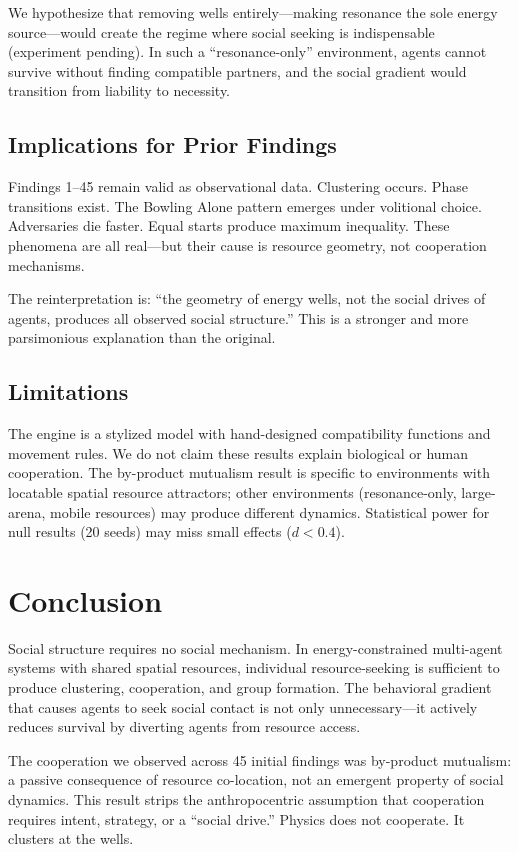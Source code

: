 \documentclass[12pt,a4paper]{article}
\begin{document}
We hypothesize that removing wells entirely---making resonance the sole energy source---would create the regime where social seeking is indispensable (experiment pending). In such a ``resonance-only'' environment, agents cannot survive without finding compatible partners, and the social gradient would transition from liability to necessity.

\subsection{Implications for Prior Findings}

Findings 1--45 remain valid as observational data. Clustering occurs. Phase transitions exist. The Bowling Alone pattern emerges under volitional choice. Adversaries die faster. Equal starts produce maximum inequality. These phenomena are all real---but their cause is resource geometry, not cooperation mechanisms.

The reinterpretation is: ``the geometry of energy wells, not the social drives of agents, produces all observed social structure.'' This is a stronger and more parsimonious explanation than the original.

\subsection{Limitations}

The engine is a stylized model with hand-designed compatibility functions and movement rules. We do not claim these results explain biological or human cooperation. The by-product mutualism result is specific to environments with locatable spatial resource attractors; other environments (resonance-only, large-arena, mobile resources) may produce different dynamics. Statistical power for null results (20 seeds) may miss small effects ($d < 0.4$).

\section{Conclusion}

Social structure requires no social mechanism. In energy-constrained multi-agent systems with shared spatial resources, individual resource-seeking is sufficient to produce clustering, cooperation, and group formation. The behavioral gradient that causes agents to seek social contact is not only unnecessary---it actively reduces survival by diverting agents from resource access.

The cooperation we observed across 45 initial findings was by-product mutualism: a passive consequence of resource co-location, not an emergent property of social dynamics. This result strips the anthropocentric assumption that cooperation requires intent, strategy, or a ``social drive.'' Physics does not cooperate. It clusters at the wells.
\end{document}
